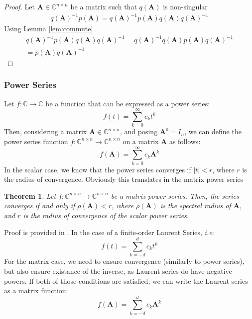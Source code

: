 \documentclass[11pt]{article}
\newtheorem{theorem}{Theorem}[section]
\numberwithin{equation}{section}
\begin{document}
\begin{proof}
    Let $\mathbf{A}\in\mathbb{C}^{n\times n}$ be a matrix such that $q(\mathbf{A})$ is non-singular
    \begin{align*}
        q(\mathbf{A})^{-1}p(\mathbf{A}) = q(\mathbf{A})^{-1}p(\mathbf{A})q(\mathbf{A})q(\mathbf{A})^{-1} 
    \end{align*}
    Using Lemma \ref{lem:commute}
    \begin{align*}        
    q(\mathbf{A})^{-1}p(\mathbf{A})q(\mathbf{A})q(\mathbf{A})^{-1} = q(\mathbf{A})^{-1}q(\mathbf{A})p(\mathbf{A})q(\mathbf{A})^{-1} \\
        = p(\mathbf{A})q(\mathbf{A})^{-1}
    \end{align*}
\end{proof}

\subsubsection*{Power Series}
Let $f:\mathbb{C}\rightarrow\mathbb{C}$ be a function that can be expressed as a power series:
\begin{equation}
    f(t) = \sum_{k=0}^\infty c_k t^k
\end{equation}
Then, considering a matrix $\mathbf{A}\in\mathbb{C}^{n\times n}$, and posing $\mathbf{A}^0 = I_n$, we can define the power series function $f:\mathbb{C}^{n\times n}\rightarrow\mathbb{C}^{n\times n}$ on a matrix $\mathbf{A}$ as follows:
\begin{equation}
    f(\mathbf{A}) = \sum_{k=0}^\infty c_k \mathbf{A}^k
\end{equation}
In the scalar case, we know that the power series converges if $|t| < r$, where $r$ is the radius of convergence. Obviously this translates in the matrix power series
\begin{theorem}\label{th:power_convergence}
    Let $f:\mathbb{C}^{n\times n}\rightarrow\mathbb{C}^{n\times n}$ be a matrix power series. Then, the series converges if and only if $\rho(\mathbf{A}) < r$, where $\rho(\mathbf{A})$ is the spectral radius of $\mathbf{A}$, and $r$ is the radius of convergence of the scalar power series.
\end{theorem}
Proof is provided in \cite{frommer2008matrix}. In the case of a finite-order Laurent Series, \textit{i.e}:
\begin{equation}
    f(t) = \sum_{k=-d}^d c_k t^k
\end{equation}
For the matrix case, we need to ensure convergence (similarly to power series), but also ensure existance of the inverse, as Laurent series do have negative powers. If both of those conditions are satisfied, we can write the Laurent series as a matrix function:
\begin{equation}
    f(\mathbf{A}) = \sum_{k=-d}^d c_k \mathbf{A}^k
\end{equation}
\end{document}
